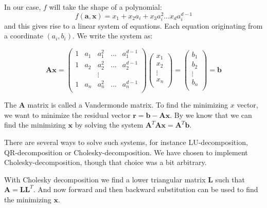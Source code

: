 In our case, $f$ will take the shape of a polynomial:
$$f(\mathbf{a},\mathbf{x}) = x_1 + x_2a_i + x_3a_i^2 \ldots x_da_i^{d-1}$$
and this gives rise to a linear system of equations. Each equation
originating from a coordinate $(a_i, b_i)$. We write the system as:

\begin{equation}
  \label{eq:vandermonde}
  \mathbf{Ax} =
  \left(
  \begin{array}{ccccc}
    1 & a_1 & a_1^2 & \ldots & a_1^{d-1} \\
    1 & a_2 & a_2^2 & \ldots & a_2^{d-1} \\
     & & \vdots & & \\
    1 & a_n & a_n^2 & \ldots & a_n^{d-1} \\
  \end{array}\right)
  \left(
  \begin{array}{c}
     x_1 \\
     x_2 \\
    \vdots \\
     x_n \\
  \end{array}\right)
=
  \left(
  \begin{array}{c}
     b_1 \\
     b_2 \\
    \vdots \\
     b_n \\
  \end{array}\right)
= \mathbf{b}
\end{equation}

The $\mathbf{A}$ matrix is called a Vandermonde matrix.  To find the
minimizing $x$ vector, we want to minimize the residual vector
$\mathbf{r} = \mathbf{b} - \mathbf{Ax}$. By  we know that
we can find the minimizing $\mathbf{x}$ by solving the system
$\mathbf{A}^T\mathbf{A}\mathbf{x} = \mathbf{A}^T\mathbf{b}$.

There are several ways to solve such systems, for instance
LU-decomposition, QR-decomposition or Cholesky-decomposition. We have
chosen to implement Cholesky-decomposition, though that choice was a
bit arbitrary.

With Cholesky decomposition we find a lower triangular matrix
$\mathbf{L}$ such that $\mathbf{A} = \mathbf{LL}^T$. And now forward
and then backward substitution can be used to find the minimizing
$\mathbf{x}$.

